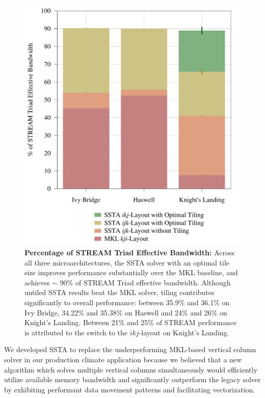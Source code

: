 \documentclass{sig-alternate-05-2015}
\begin{document}
\begin{figure}[!h]
    \centering
    \caption{
      \textbf{Percentage of STREAM Triad Effective Bandwidth:}
      Across all three microarchitectures, the SSTA solver with an optimal tile
        size improves performance substantially over the MKL baseline, and
        achieves \(\sim\) 90\% of STREAM Triad effective bandwidth.
      Although untiled SSTA results beat the MKL solver, tiling contributes
        significantly to overall performance: between 35.9\% and 36.1\% on 
        Ivy Bridge, 34.22\% and 35.38\% on Haswell and 24\% and 26\% on 
        Knight's Landing.
      Between 21\% and 25\% of STREAM performance is attributed to the switch to
        the \(ikj\)-layout on Knight's Landing. 
    }
    \label{fig:results:efficiency}
    \includegraphics[width=0.95\columnwidth]{figures/post_tsb_impact_of_optimizations_histogram_09_03_2016_09_04_2016_1socket.pdf}
\end{figure}

We developed SSTA to replace the underperforming MKL-based vertical column
  solver in our production climate application because we believed that a new
  algorithm which solves multiple vertical columns simultaneously would
  efficiently utilize available memory bandwidth and significantly outperform the
  legacy solver by exhibiting performant data movement patterns and facilitating
  vectorization.
\end{document}
